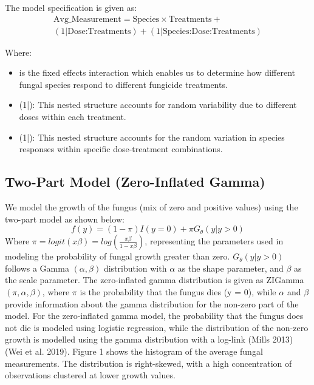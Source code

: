 \documentclass[
  10pt,
  letterpaper,
  twocolumn]{article}
\begin{document}
The model specification is given as:
\begin{multline}
\text{Avg\_Measurement} = \text{Species} \times \text{Treatments} + \\
(1|\text{Dose:Treatments}) + (1|\text{Species:Dose:Treatments})
\end{multline}

Where:
\begin{itemize}
\setlength{\itemsep}{0pt}
\setlength{\parskip}{0pt}
\item {} \times {} is the fixed effects interaction which enables us to determine how different fungal species respond to different fungicide treatments.
\item (1|): This nested structure accounts for random variability due to different doses within each treatment.
\item (1|): This nested structure accounts for the random variation in species responses within specific dose-treatment combinations.
\end{itemize}

\hypertarget{two-part-model-zero-inflated-gamma}{%
\subsection{Two-Part Model (Zero-Inflated
Gamma)}\label{two-part-model-zero-inflated-gamma}}

\vspace{-1em}

We model the growth of the fungus (mix of zero and positive values)
using the two-part model as shown below: \begin{equation}
f(y) = (1 - \pi) I(y = 0) + \pi G_\theta(y| y > 0)
\end{equation} Where
\(\pi = logit(x\beta) = log (\frac{x\beta}{1-x\beta})\), representing
the parameters used in modeling the probability of fungal growth greater
than zero. \(G_\theta(y| y > 0)\) follows a Gamma \((\alpha,\beta)\)
distribution with \(\alpha\) as the shape parameter, and \(\beta\) as
the scale parameter. The zero-inflated gamma distribution is given as
ZIGamma\((\pi, \alpha,\beta)\), where \(\pi\) is the probability that
the fungus dies (y = 0), while \(\alpha\) and \(\beta\) provide
information about the gamma distribution for the non-zero part of the
model. For the zero-inflated gamma model, the probability that the
fungus does not die is modeled using logistic regression, while the
distribution of the non-zero growth is modelled using the gamma
distribution with a log-link (Mills 2013) (Wei et al. 2019). Figure 1
shows the histogram of the average fungal measurements. The distribution
is right-skewed, with a high concentration of observations clustered at
lower growth values.
\end{document}
